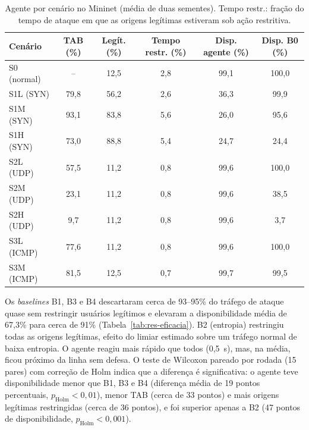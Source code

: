\documentclass[12pt]{article}
\begin{document}
\begin{table}[ht]
\centering
\caption{Agente por cenário no Mininet (média de duas sementes). Tempo restr.: fração do
  tempo de ataque em que as origens legítimas estiveram sob ação restritiva.}
\label{tab:res-agente}
\footnotesize
\begin{tabular}{@{}lccccc@{}}
\toprule
\textbf{Cenário} & \textbf{TAB (\%)} & \textbf{Legít. (\%)} &
\textbf{Tempo restr. (\%)} & \textbf{Disp. agente (\%)} & \textbf{Disp. B0 (\%)} \\
\midrule
S0 (normal)   & --   & 12,5 & 2,8 & 99,1 & 100,0 \\
S1L (SYN)     & 79,8 & 56,2 & 2,6 & 36,3 & 99,9 \\
S1M (SYN)     & 93,1 & 83,8 & 5,6 & 26,0 & 95,6 \\
S1H (SYN)     & 73,0 & 88,8 & 5,4 & 24,7 & 24,4 \\
S2L (UDP)     & 57,5 & 11,2 & 0,8 & 99,6 & 100,0 \\
S2M (UDP)     & 23,1 & 11,2 & 0,8 & 99,6 & 38,5 \\
S2H (UDP)     & 9,7  & 11,2 & 0,8 & 99,6 & 3,7 \\
S3L (ICMP)    & 77,6 & 11,2 & 0,8 & 99,6 & 100,0 \\
S3M (ICMP)    & 81,5 & 12,5 & 0,7 & 99,7 & 99,5 \\
\bottomrule
\end{tabular}
\end{table}

Os \textit{baselines} B1, B3 e B4 descartaram cerca de 93--95\% do tráfego de
ataque quase sem restringir usuários legítimos e elevaram a disponibilidade
média de 67,3\% para cerca de 91\% (Tabela~\ref{tab:res-eficacia}). B2
(entropia) restringiu todas as origens legítimas, efeito do limiar estimado
sobre um tráfego normal de baixa entropia. O agente reagiu mais rápido que
todos (0,5~s), mas, na média, ficou próximo da linha sem defesa. O teste de
Wilcoxon pareado por rodada (15 pares) com correção de Holm indica que a
diferença é significativa: o agente teve disponibilidade menor que B1, B3 e
B4 (diferença média de 19 pontos percentuais, $p_{\text{Holm}} < 0{,}01$),
menor TAB (cerca de 33 pontos) e mais origens legítimas restringidas (cerca
de 36 pontos), e foi superior apenas a B2 (47 pontos de disponibilidade,
$p_{\text{Holm}} < 0{,}001$).
\end{document}
